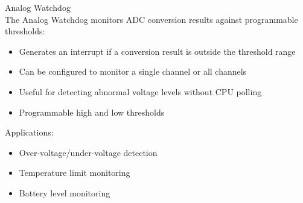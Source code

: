 \begin{concept}{Analog Watchdog}\\
The Analog Watchdog monitors ADC conversion results against programmable thresholds:
\begin{itemize}
    \item Generates an interrupt if a conversion result is outside the threshold range
    \item Can be configured to monitor a single channel or all channels
    \item Useful for detecting abnormal voltage levels without CPU polling
    \item Programmable high and low thresholds
\end{itemize}
Applications:
\begin{itemize}
    \item Over-voltage/under-voltage detection
    \item Temperature limit monitoring
    \item Battery level monitoring
\end{itemize}
\end{concept}

